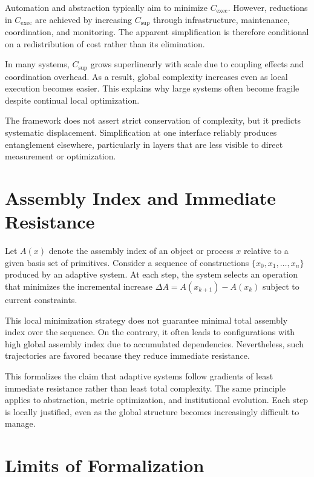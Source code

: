 \documentclass[12pt]{article}
\begin{document}
Automation and abstraction typically aim to minimize $C_{\text{exec}}$. However, reductions in $C_{\text{exec}}$ are achieved by increasing $C_{\text{sup}}$ through infrastructure, maintenance, coordination, and monitoring. The apparent simplification is therefore conditional on a redistribution of cost rather than its elimination.

In many systems, $C_{\text{sup}}$ grows superlinearly with scale due to coupling effects and coordination overhead. As a result, global complexity increases even as local execution becomes easier. This explains why large systems often become fragile despite continual local optimization.

The framework does not assert strict conservation of complexity, but it predicts systematic displacement. Simplification at one interface reliably produces entanglement elsewhere, particularly in layers that are less visible to direct measurement or optimization.

\section{Assembly Index and Immediate Resistance}

Let $A(x)$ denote the assembly index of an object or process $x$ relative to a given basis set of primitives. Consider a sequence of constructions $\{x_0, x_1, \dots, x_n\}$ produced by an adaptive system. At each step, the system selects an operation that minimizes the incremental increase $\Delta A = A(x_{k+1}) - A(x_k)$ subject to current constraints.

This local minimization strategy does not guarantee minimal total assembly index over the sequence. On the contrary, it often leads to configurations with high global assembly index due to accumulated dependencies. Nevertheless, such trajectories are favored because they reduce immediate resistance.

This formalizes the claim that adaptive systems follow gradients of least immediate resistance rather than least total complexity. The same principle applies to abstraction, metric optimization, and institutional evolution. Each step is locally justified, even as the global structure becomes increasingly difficult to manage.

\section{Limits of Formalization}
\end{document}
